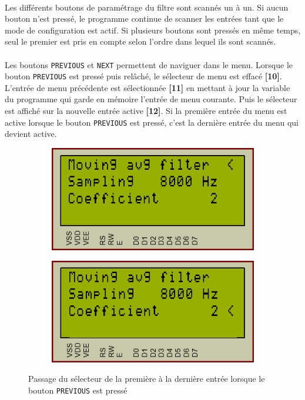 \documentclass{article}
\begin{document}
    \paragraph{}
    Les différents boutons de paramétrage du filtre sont scannés un à un. Si aucun bouton n'est pressé, le programme continue de scanner les entrées tant que le mode de configuration est actif. Si plusieurs boutons sont pressés en même temps, seul le premier est pris en compte selon l'ordre dans lequel ils sont scannés.

    \paragraph{}
    Les boutons \texttt{PREVIOUS} et \texttt{NEXT} permettent de naviguer dans le menu. Lorsque le bouton \texttt{PREVIOUS} est pressé puis relâché, le sélecteur de menu est effacé \textbf{[10]}. L'entrée de menu précédente est sélectionnée \textbf{[11]} en mettant à jour la variable du programme qui garde en mémoire l'entrée de menu courante. Puis le sélecteur est affiché sur la nouvelle entrée active \textbf{[12]}. Si la première entrée du menu est active lorsque le bouton \texttt{PREVIOUS} est pressé, c'est la dernière entrée du menu qui devient active.

    \begin{figure}[H]
        \centering
        \begin{subfigure}[b]{.34\textwidth}
            \centering
            \includegraphics[width=.9\textwidth]{./images/previous_a.png}
        \end{subfigure}
        \begin{subfigure}[b]{.34\textwidth}
            \centering
            \includegraphics[width=.9\textwidth]{./images/previous_b.png}
        \end{subfigure}
        \caption{Passage du sélecteur de la première à la dernière entrée lorsque le bouton \texttt{PREVIOUS} est pressé}
    \end{figure}
\end{document}
